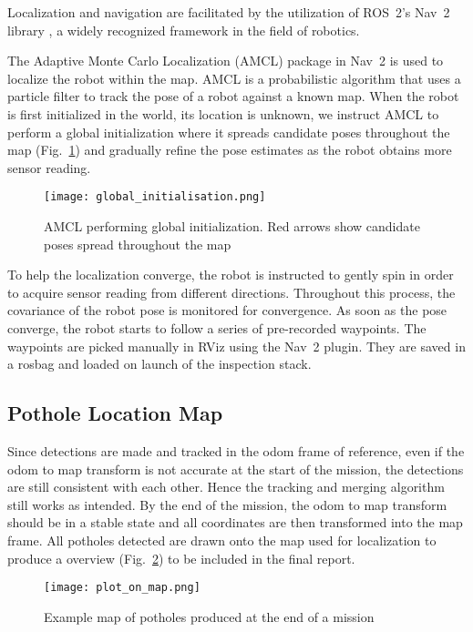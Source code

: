 \documentclass[conference]{IEEEtran}
\begin{document}
Localization and navigation are facilitated by the utilization of ROS~2's Nav~2 library \cite{macenskiMarathonNavigationSystem2020}, a widely recognized framework in the field of robotics.

The Adaptive Monte Carlo Localization (AMCL) package in Nav~2 is used to localize the robot within the map. AMCL is a probabilistic algorithm that uses a particle filter to track the pose of a robot against a known map. When the robot is first initialized in the world, its location is unknown, we instruct AMCL to perform a global initialization where it spreads candidate poses throughout the map (Fig.~\ref{fig:global_initialisation}) and gradually refine the pose estimates as the robot obtains more sensor reading.

\begin{figure}[ht]
    \centering
    \texttt{[image: global\_initialisation.png]}
    \caption{AMCL performing global initialization. Red arrows show candidate poses spread throughout the map}
    \label{fig:global_initialisation}
\end{figure}

To help the localization converge, the robot is instructed to gently spin in order to acquire sensor reading from different directions. Throughout this process, the covariance of the robot pose is monitored for convergence. As soon as the pose converge, the robot starts to follow a series of pre-recorded waypoints. The waypoints are picked manually in RViz using the Nav~2 plugin. They are saved in a rosbag and loaded on launch of the inspection stack.

\subsection{Pothole Location Map}

Since detections are made and tracked in the odom frame of reference, even if the odom to map transform is not accurate at the start of the mission, the detections are still consistent with each other. Hence the tracking and merging algorithm still works as intended. By the end of the mission, the odom to map transform should be in a stable state and all coordinates are then transformed into the map frame. All potholes detected are drawn onto the map used for localization to produce a overview (Fig.~\ref{fig:pothole_map}) to be included in the final report.

\begin{figure}
    \centering
    \texttt{[image: plot\_on\_map.png]}
    \caption{Example map of potholes produced at the end of a mission}
    \label{fig:pothole_map}
\end{figure}
\end{document}
